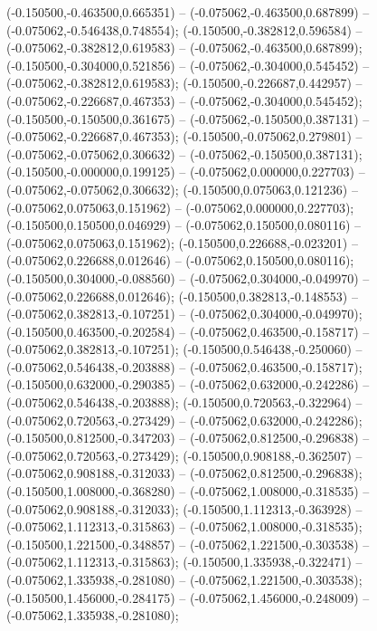  (-0.150500,-0.463500,0.665351) -- (-0.075062,-0.463500,0.687899) -- (-0.075062,-0.546438,0.748554);
 (-0.150500,-0.382812,0.596584) -- (-0.075062,-0.382812,0.619583) -- (-0.075062,-0.463500,0.687899);
 (-0.150500,-0.304000,0.521856) -- (-0.075062,-0.304000,0.545452) -- (-0.075062,-0.382812,0.619583);
 (-0.150500,-0.226687,0.442957) -- (-0.075062,-0.226687,0.467353) -- (-0.075062,-0.304000,0.545452);
 (-0.150500,-0.150500,0.361675) -- (-0.075062,-0.150500,0.387131) -- (-0.075062,-0.226687,0.467353);
 (-0.150500,-0.075062,0.279801) -- (-0.075062,-0.075062,0.306632) -- (-0.075062,-0.150500,0.387131);
 (-0.150500,-0.000000,0.199125) -- (-0.075062,0.000000,0.227703) -- (-0.075062,-0.075062,0.306632);
 (-0.150500,0.075063,0.121236) -- (-0.075062,0.075063,0.151962) -- (-0.075062,0.000000,0.227703);
 (-0.150500,0.150500,0.046929) -- (-0.075062,0.150500,0.080116) -- (-0.075062,0.075063,0.151962);
 (-0.150500,0.226688,-0.023201) -- (-0.075062,0.226688,0.012646) -- (-0.075062,0.150500,0.080116);
 (-0.150500,0.304000,-0.088560) -- (-0.075062,0.304000,-0.049970) -- (-0.075062,0.226688,0.012646);
 (-0.150500,0.382813,-0.148553) -- (-0.075062,0.382813,-0.107251) -- (-0.075062,0.304000,-0.049970);
 (-0.150500,0.463500,-0.202584) -- (-0.075062,0.463500,-0.158717) -- (-0.075062,0.382813,-0.107251);
 (-0.150500,0.546438,-0.250060) -- (-0.075062,0.546438,-0.203888) -- (-0.075062,0.463500,-0.158717);
 (-0.150500,0.632000,-0.290385) -- (-0.075062,0.632000,-0.242286) -- (-0.075062,0.546438,-0.203888);
 (-0.150500,0.720563,-0.322964) -- (-0.075062,0.720563,-0.273429) -- (-0.075062,0.632000,-0.242286);
 (-0.150500,0.812500,-0.347203) -- (-0.075062,0.812500,-0.296838) -- (-0.075062,0.720563,-0.273429);
 (-0.150500,0.908188,-0.362507) -- (-0.075062,0.908188,-0.312033) -- (-0.075062,0.812500,-0.296838);
 (-0.150500,1.008000,-0.368280) -- (-0.075062,1.008000,-0.318535) -- (-0.075062,0.908188,-0.312033);
 (-0.150500,1.112313,-0.363928) -- (-0.075062,1.112313,-0.315863) -- (-0.075062,1.008000,-0.318535);
 (-0.150500,1.221500,-0.348857) -- (-0.075062,1.221500,-0.303538) -- (-0.075062,1.112313,-0.315863);
 (-0.150500,1.335938,-0.322471) -- (-0.075062,1.335938,-0.281080) -- (-0.075062,1.221500,-0.303538);
 (-0.150500,1.456000,-0.284175) -- (-0.075062,1.456000,-0.248009) -- (-0.075062,1.335938,-0.281080);
